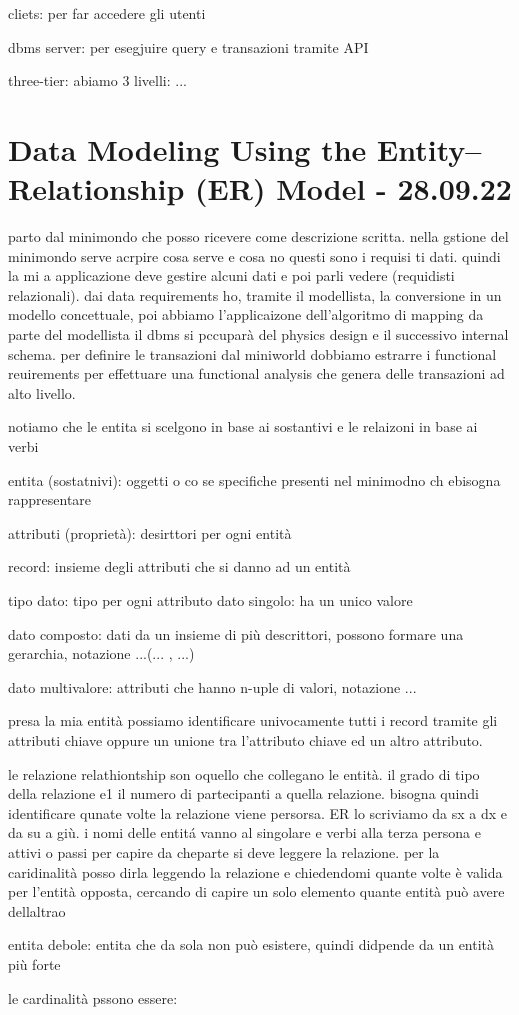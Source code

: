 cliets: per far accedere gli utenti

dbms server: per esegjuire query e transazioni tramite API 

three-tier: abiamo 3 livelli: ...





\section{Data Modeling Using the Entity–Relationship (ER) Model - 28.09.22}

parto dal minimondo che posso ricevere come descrizione scritta. nella gstione del minimondo serve acrpire cosa serve e cosa no questi sono i requisi ti dati. quindi la mi a applicazione deve gestire alcuni dati e poi parli vedere (requidisti relazionali). dai data requirements ho, tramite il modellista, la conversione in un modello concettuale, poi abbiamo l'applicaizone dell'algoritmo di mapping da parte del modellista il dbms si pccuparà del physics design e il successivo internal schema. per definire le transazioni dal miniworld dobbiamo estrarre i functional reuirements per effettuare una functional analysis che genera delle transazioni ad alto livello.


notiamo che le entita si scelgono in base ai sostantivi e le relaizoni in base ai verbi


entita (sostatnivi): oggetti o co se specifiche presenti nel minimodno ch ebisogna rappresentare

attributi (proprietà): desirttori per ogni entità

record: insieme degli attributi che si danno ad un entità

tipo dato: tipo per ogni attributo
	dato singolo: ha un unico valore
	
	dato composto: dati da un insieme di più descrittori, possono formare una gerarchia, notazione ...(... , ...)
	
	dato multivalore: attributi che hanno n-uple di valori, notazione {...}
	
	
presa la mia entità possiamo identificare univocamente tutti i record tramite gli attributi chiave oppure un unione tra l'attributo chiave ed un altro attributo.


le relazione relathiontship son oquello che collegano le entità. il grado di tipo della relazione e1 il numero di partecipanti a quella relazione. bisogna quindi identificare qunate volte la relazione viene persorsa. ER lo scriviamo da sx a dx e da su a giù. i nomi delle entitá vanno al singolare e verbi alla terza persona e attivi o passi per capire da cheparte si deve leggere la relazione. per la caridinalità posso dirla leggendo la relazione e chiedendomi quante volte è valida per l'entità opposta, cercando di capire un solo elemento  quante entità può avere dellaltrao



entita debole: entita che da sola non può esistere, quindi didpende da un entità più forte



le cardinalità pssono essere:


